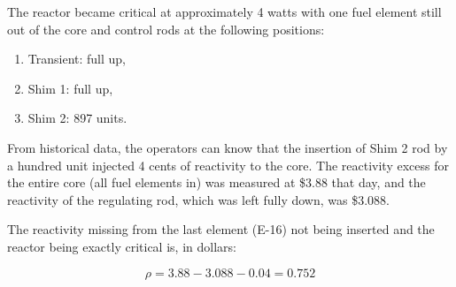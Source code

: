 The reactor became critical at approximately 4 watts with one fuel element still out of the core and control rods at the following positions:
\begin{enumerate}
\item Transient: full up,
\item Shim 1: full up,
\item Shim 2: 897 units.
\end{enumerate}

From historical data, the operators can know that the insertion of Shim 2 rod by a hundred unit injected 4 cents of reactivity to the core. The reactivity excess for the entire core (all fuel elements in) was measured at \$3.88 that day, and the reactivity of the regulating rod, which was left fully down, was \$3.088.

The reactivity missing from the last element (E-16) not being inserted and the reactor being exactly critical is, in dollars:

\begin{equation}\label{eq8}
\rho = 3.88 - 3.088 - 0.04 = 0.752
\end{equation}


